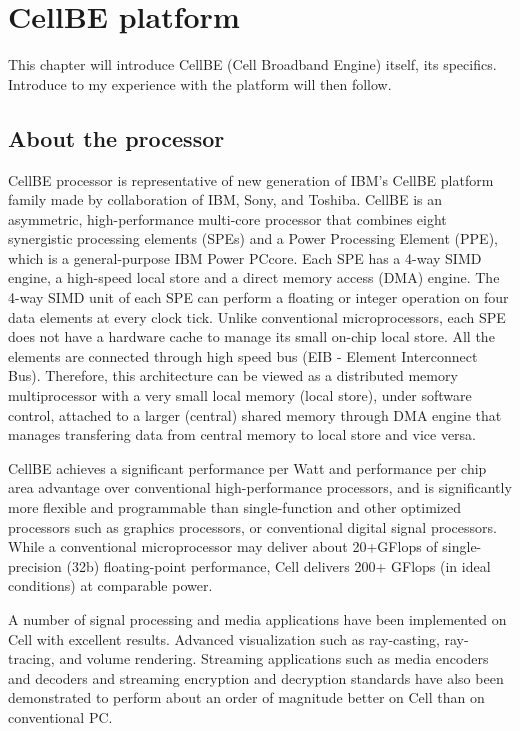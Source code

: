 \chapter{CellBE platform}

This chapter will introduce CellBE (Cell Broadband Engine) itself, its specifics. Introduce to my experience with the platform will then follow.

\section{About the processor}

CellBE processor is representative of new generation of IBM's CellBE platform family made by collaboration of IBM, Sony, and Toshiba. CellBE is an asymmetric, high-performance multi-core processor that combines eight synergistic processing elements (SPEs) and a Power Processing Element (PPE), which is a general-purpose IBM Power PC\textregistered core. Each SPE has a 4-way SIMD engine, a high-speed local store and a direct memory access (DMA) engine. The 4-way SIMD unit of each SPE can perform a floating or integer operation on four data elements at every clock tick. Unlike conventional microprocessors, each SPE does not have a hardware cache to manage its small on-chip local store. All the elements are connected through high speed bus (EIB - Element Interconnect Bus). Therefore, this architecture can be viewed as a distributed memory multiprocessor with a very small local memory (local store), under software control, attached to a larger (central) shared memory through DMA engine that manages transfering data from central memory to local store and vice versa.

CellBE achieves a significant performance per Watt and performance per chip area advantage over conventional high-performance processors, and is significantly more flexible and programmable than single-function and other optimized processors such as graphics processors, or conventional digital signal processors. While a conventional microprocessor may deliver about 20+GFlops of single-precision (32b) floating-point performance, Cell delivers 200+ GFlops (in ideal conditions) at comparable power.

A number of signal processing and media applications have been implemented on Cell with excellent results. Advanced visualization such as ray-casting, ray-tracing, and volume rendering. Streaming applications such as media encoders and decoders and streaming encryption and decryption standards have also been demonstrated to perform about an order of magnitude better on Cell than on conventional PC.


